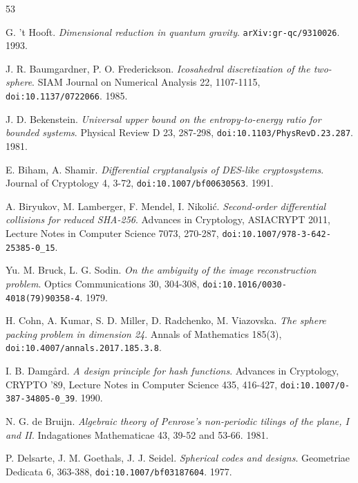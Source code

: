 \backmatter
{}
\begin{thebibliography}{53}

G. 't Hooft. \emph{Dimensional reduction in quantum gravity}. \texttt{arXiv:gr-qc/\allowbreak{}9310026}. 1993.

J. R. Baumgardner, P. O. Frederickson. \emph{Icosahedral discretization of the two-sphere}. SIAM Journal on Numerical Analysis 22, 1107-1115, \texttt{doi:10.1137/\allowbreak{}0722066}. 1985.

J. D. Bekenstein. \emph{Universal upper bound on the entropy-to-energy ratio for bounded systems}. Physical Review D 23, 287-298, \texttt{doi:10.1103/\allowbreak{}PhysRevD.23.287}. 1981.

E. Biham, A. Shamir. \emph{Differential cryptanalysis of DES-like cryptosystems}. Journal of Cryptology 4, 3-72, \texttt{doi:10.1007/\allowbreak{}bf00630563}. 1991.

A. Biryukov, M. Lamberger, F. Mendel, I. Nikolić. \emph{Second-order differential collisions for reduced SHA-256}. Advances in Cryptology, ASIACRYPT 2011, Lecture Notes in Computer Science 7073, 270-287, \texttt{doi:10.1007/\allowbreak{}978-3-642-25385-0\_\allowbreak{}15}.

Yu. M. Bruck, L. G. Sodin. \emph{On the ambiguity of the image reconstruction problem}. Optics Communications 30, 304-308, \texttt{doi:10.1016/\allowbreak{}0030-4018(79)90358-4}. 1979.

H. Cohn, A. Kumar, S. D. Miller, D. Radchenko, M. Viazovska. \emph{The sphere packing problem in dimension 24}. Annals of Mathematics 185(3), \texttt{doi:10.4007/\allowbreak{}annals.2017.185.3.8}.

I. B. Damgård. \emph{A design principle for hash functions}. Advances in Cryptology, CRYPTO '89, Lecture Notes in Computer Science 435, 416-427, \texttt{doi:10.1007/\allowbreak{}0-387-34805-0\_\allowbreak{}39}. 1990.

N. G. de Bruijn. \emph{Algebraic theory of Penrose's non-periodic tilings of the plane, I and II}. Indagationes Mathematicae 43, 39-52 and 53-66. 1981.

P. Delsarte, J. M. Goethals, J. J. Seidel. \emph{Spherical codes and designs}. Geometriae Dedicata 6, 363-388, \texttt{doi:10.1007/\allowbreak{}bf03187604}. 1977.


\end{thebibliography}

